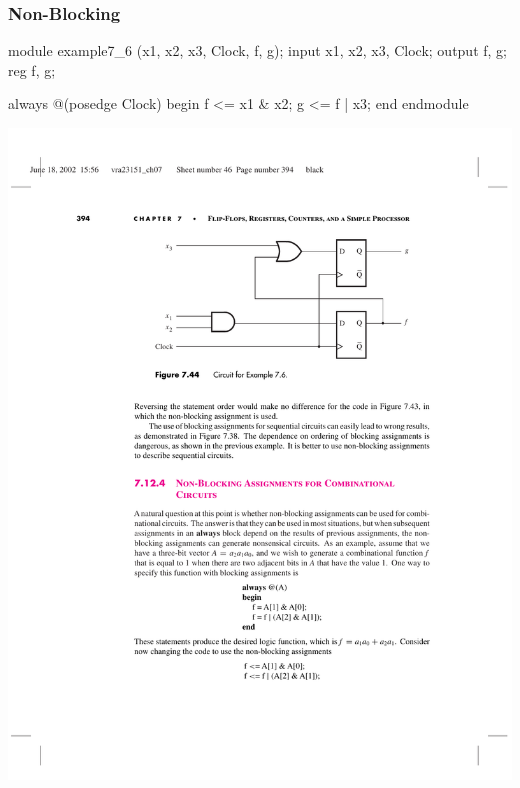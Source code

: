 \begin{frame}[fragile]
	\frametitle{Non-Blocking}
	\begin{verilogcode}
module example7_6 (x1, x2, x3, Clock, f, g); 
  input x1, x2, x3, Clock;
  output f, g;
  reg f, g;

  always @(posedge Clock) 
  begin
    f <= x1 & x2;
    g <= f | x3; 
  end
endmodule
	\end{verilogcode}
    \includegraphics[scale=.6]{figs/VerilogFig7_44}
\end{frame}

